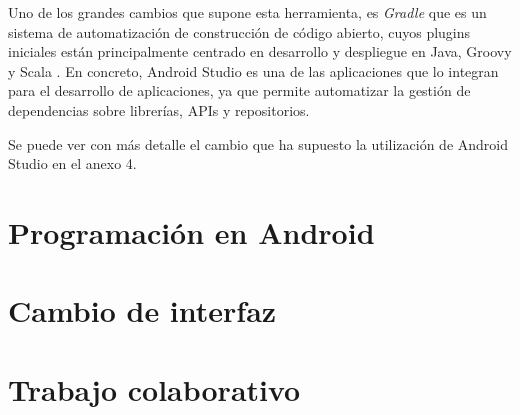 Uno de los grandes cambios que supone esta herramienta, es \textit{Gradle} \cite{gradle2} que es un sistema de automatización de construcción de código abierto, cuyos plugins iniciales están principalmente centrado en desarrollo y despliegue en Java, Groovy y Scala \cite{gradle1}. En concreto, Android Studio es una de las aplicaciones que lo integran para el desarrollo de aplicaciones, ya que permite automatizar la gestión de dependencias sobre librerías, APIs y repositorios.

Se puede ver con más detalle el cambio que ha supuesto la utilización de Android Studio en el anexo 4.

\section{Programación en Android}

\section{Cambio de interfaz}

\section{Trabajo colaborativo}
 
